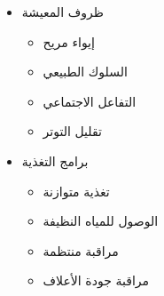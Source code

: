 \begin{itemize}
\begin{itemize}
        \item ظروف المعيشة
        \begin{itemize}
            \item إيواء مريح
            \item السلوك الطبيعي
            \item التفاعل الاجتماعي
            \item تقليل التوتر
        \end{itemize}
        
        \item برامج التغذية
        \begin{itemize}
            \item تغذية متوازنة
            \item الوصول للمياه النظيفة
            \item مراقبة منتظمة
            \item مراقبة جودة الأعلاف
        \end{itemize}
    \end{itemize}
\end{itemize}

